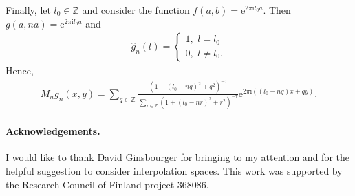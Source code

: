 \documentclass{article}
\renewcommand{\i}{\mathrm{i}}
\newcommand{\Z}{\mathbb{Z}}
\newcommand{\e}{\mathrm{e}}
\begin{document}
Finally, let $l_0 \in \Z $ and consider the function $f(a,b)=\e^{2\pi \i l_0 a}$. Then $g(a,na)=\e^{2\pi \i l_0 a }$ and 
\begin{align*}
    \hat{g}_n(l)=\begin{cases}
1, \, \, l=l_0 \\
0, \, \, l\neq l_0.
    \end{cases}
    \end{align*}
Hence,
    \begin{align*}
        M_n g_n(x,y)= \sum_{q \in \Z} \frac{(1+(l_0-nq)^2+q^2)^{-\tau}}{\sum_{r \in \Z} (1+(l_0-nr)^2+r^2)^{-\tau}} \e^{2\pi \i ((l_0-nq)x+qy)}.
    \end{align*}

 \color{black}





\paragraph*{Acknowledgements.}{I would like to thank David Ginsbourger for bringing \cite{lagatta2013continuous} to my attention and for the helpful suggestion to consider interpolation spaces. This work was supported by the Research Council of Finland project 368086.}





\newpage
\end{document}
